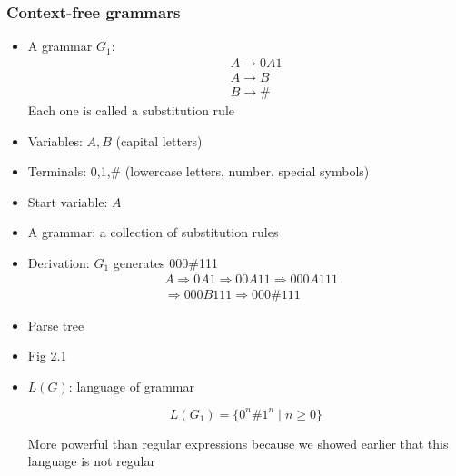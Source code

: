 \begin{frame}[allowframebreaks] \frametitle{Context-free grammars}
  \begin{itemize}
  \item
    A grammar $G_1$:
\begin{eqnarray*}
  && A \rightarrow 0A1\\
&& A \rightarrow B\\
&& B \rightarrow \#
\end{eqnarray*}
Each one is called a substitution rule
\item Variables: $A,B$ (capital letters)
\item Terminals: 0,1,\# (lowercase letters,
number, special symbols)
\item Start variable: $A$
\item A grammar: a collection of substitution rules
\item Derivation: $G_1$ generates 
000\#111
\begin{equation*}
  \begin{split}
&  A
\Rightarrow 0A1 \Rightarrow
00A11 
\Rightarrow 000A111\\
& 
\Rightarrow 000B111
\Rightarrow 000\#111
\end{split}
\end{equation*}
\item Parse tree

\item [] Fig 2.1

\framebreak  

\item $L(G)$: language of grammar

  \begin{equation*}
L(G_1) = 
\{0^n \#  1^n\mid n \geq 0\}
\end{equation*}

More powerful than regular expressions because we showed earlier
that this language is not regular


\end{itemize}
\end{frame}
